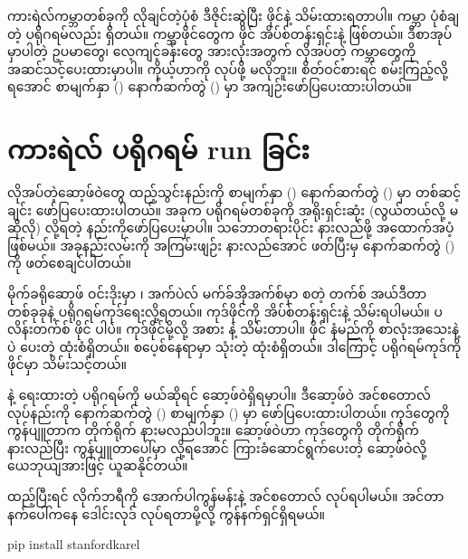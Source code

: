 ကားရဲလ်ကမ္ဘာတစ်ခုကို လိုချင်တဲ့ပုံစံ ဒီဇိုင်းဆွဲပြီး ဖိုင်နဲ့ သိမ်းထားရတာပါ။ ကမ္ဘာ ပုံစံချတဲ့ ပရိုဂရမ်လည်း ရှိတယ်။ ကမ္ဘာဖိုင်တွေက  ဖိုင် အိပ်စ်တန်းရှင်းနဲ့ ဖြစ်တယ်။ ဒီစာအုပ်မှာပါတဲ့ ဥပမာတွေ၊ လေ့ကျင့်ခန်းတွေ အားလုံးအတွက် လိုအပ်တဲ့ ကမ္ဘာတွေကို အဆင်သင့်ပေးထားမှာပါ။ ကိုယ့်ဟာကို လုပ်ဖို့ မလိုဘူး။ စိတ်ဝင်စားရင် စမ်းကြည့်လို့ရအောင် စာမျက်နှာ (\fRefNo{\pageref{apdx:02}}) နောက်ဆက်တွဲ (\fRefNo{\ref{apdx:02}}) မှာ အကျဉ်းဖော်ပြပေးထားပါတယ်။

\section{ကားရဲလ် ပရိုဂရမ် run ခြင်း}

လိုအပ်တဲ့ဆော့ဖ်ဝဲတွေ ထည့်သွင်းနည်းကို စာမျက်နှာ (\fRefNo{\pageref{apdx:01}}) နောက်ဆက်တွဲ (\fRefNo{\ref{apdx:01}}) မှာ တစ်ဆင့်ချင်း ဖော်ပြပေးထားပါတယ်။ အခုက  ပရိုဂရမ်တစ်ခုကို အရိုးရှင်းဆုံး (လွယ်တယ်လို့ မဆိုလို)   လို့ရတဲ့ နည်းကိုဖော်ပြပေးမှာပါ။ သဘောတရားပိုင်း နားလည်ဖို့ အထောက်အပံ့ဖြစ်မယ်။ အခုနည်းလမ်းကို အကြမ်းဖျဉ်း နားလည်အောင် ဖတ်ပြီးမှ နောက်ဆက်တွဲ (\fRefNo{\ref{apdx:01}}) ကို ဖတ်စေချင်ပါတယ်။

မိုက်ခရိုဆော့ဖ် ဝင်းဒိုးမှာ  ၊ အက်ပဲလ် မက်ခ်အိုအက်စ်မှာ   စတဲ့ တက်စ် အယ်ဒီတာတစ်ခုခုနဲ့ ပရိုဂရမ်ကုဒ်ရေးလို့ရတယ်။ ကုဒ်ဖိုင်ကို  အိပ်စ်တန်းရှင်းနဲ့ သိမ်းရပါမယ်။ ပလိန်းတက်စ်  ဖိုင် ပါပဲ။  ကုဒ်ဖိုင်မို့လို့  အစား  နဲ့ သိမ်းတာပါ။  ဖိုင် နံမည်ကို စာလုံးအသေးနဲ့ပဲ ပေးတဲ့ ထုံးစံရှိတယ်။  စပေ့စ်နေရာမှာ \fEnSnd{ \_}  သုံးတဲ့ ထုံးစံရှိတယ်။ ဒါကြောင့်  ပရိုဂရမ်ကုဒ်ကို  ဖိုင်မှာ သိမ်းသင့်တယ်။ 

 နဲ့ ရေးထားတဲ့ ပရိုဂရမ်ကို  မယ်ဆိုရင်  ဆော့ဖ်ဝဲရှိရမှာပါ။ ဒီဆော့ဖ်ဝဲ အင်စတောလ် လုပ်နည်းကို နောက်ဆက်တွဲ (\fRefNo{\ref{apdx:01}}) စာမျက်နှာ (\fRefNo{\pageref{subsec:pyinstl}}) မှာ ဖော်ပြပေးထားပါတယ်။  ကုဒ်တွေကို ကွန်ပျူတာက တိုက်ရိုက် နားမလည်ပါဘူး။  ဆော့ဖ်ဝဲဟာ  ကုဒ်တွေကို တိုက်ရိုက် နားလည်ပြီး ကွန်ပျူတာပေါ်မှာ  လို့ရအောင် ကြားခံဆောင်ရွက်ပေးတဲ့ ဆော့ဖ်ဝဲလို့ ယေဘုယျအားဖြင့် ယူဆနိုင်တယ်။

 ထည့်ပြီးရင်  လိုက်ဘရီကို အောက်ပါကွန်မန်းနဲ့ အင်စတောလ် လုပ်ရပါမယ်။ အင်တာနက်ပေါ်ကနေ ဒေါင်းလုဒ် လုပ်ရတာမို့လို့ ကွန်နက်ရှင်ရှိရမယ်။
%
\begin{codetxt}
pip install stanfordkarel
\end{codetxt}
%

